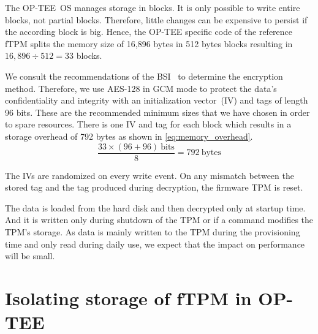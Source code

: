 The OP-TEE~OS manages storage in blocks.
It is only possible to write entire blocks, not partial blocks.
Therefore, little changes can be expensive to persist if the according block is big.
Hence, the OP-TEE specific code of the reference fTPM splits the memory size of 16,896 bytes in 512 bytes blocks resulting in \( 16{,}896 \div 512 = 33 \) blocks.

We consult the recommendations of the BSI~\cite{bsi-key-recommendations} to determine the encryption method.
Therefore, we use AES-128 in GCM mode to protect the data's confidentiality and integrity with an initialization vector~(IV) and tags of length 96 bits.
These are the recommended minimum sizes that we have chosen in order to spare resources.
There is one IV and tag for each block which results in a storage overhead of 792 bytes as shown in \autoref{eq:memory_overhead}.
\begin{equation}
  \label{eq:memory_overhead}
  \frac{33 \times (96 + 96)\ \text{bits}}{8} = 792\ \text{bytes}
\end{equation}

The IVs are randomized on every write event.
On any mismatch between the stored tag and the tag produced during decryption, the firmware TPM is reset. 

The data is loaded from the hard disk and then decrypted only at startup time.
And it is written only during shutdown of the TPM or if a command modifies the TPM's storage.
As data is mainly written to the TPM during the provisioning time and only read during daily use, we expect that the impact on performance will be small.

\section{Isolating storage of fTPM in OP-TEE}

